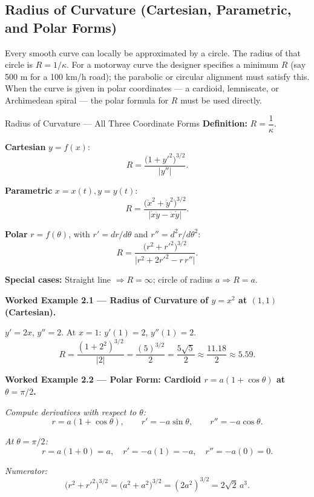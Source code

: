 \documentclass[12pt,a4paper]{article}
\begin{document}
\subsection{Radius of Curvature (Cartesian, Parametric, and Polar Forms)}

Every smooth curve can locally be approximated by a circle. The radius of that circle is $R = 1/\kappa$. For a motorway curve the designer specifies a minimum $R$ (say 500 m for a 100 km/h road); the parabolic or circular alignment must satisfy this. When the curve is given in polar coordinates --- a cardioid, lemniscate, or Archimedean spiral --- the polar formula for $R$ must be used directly.

\begin{infobox}{Radius of Curvature --- All Three Coordinate Forms}
\textbf{Definition:} $R = \dfrac{1}{\kappa}$.

\medskip
\textbf{Cartesian} $y = f(x)$:
\[
  R = \frac{\bigl(1 + y'^{2}\bigr)^{3/2}}{|y''|}.
\]

\textbf{Parametric} $x=x(t), y=y(t)$:
\[
  R = \frac{\bigl(\dot{x}^{2}+\dot{y}^{2}\bigr)^{3/2}}{|\dot{x}\ddot{y} - \ddot{x}\dot{y}|}.
\]

\textbf{Polar} $r = f(\theta)$, with $r' = dr/d\theta$ and $r'' = d^{2}r/d\theta^{2}$:
\[
  R = \frac{\bigl(r^{2}+r'^{2}\bigr)^{3/2}}{\bigl|r^{2}+2r'^{2}-r\,r''\bigr|}.
\]

\textbf{Special cases:} Straight line $\Rightarrow R = \infty$; circle of radius $a \Rightarrow R = a$.
\end{infobox}

\textbf{Worked Example 2.1 --- Radius of Curvature of $y = x^2$ at $(1,1)$ (Cartesian).}

$y' = 2x$, $y'' = 2$. At $x = 1$: $y'(1) = 2$, $y''(1) = 2$.
\[
  R = \frac{(1 + 2^{2})^{3/2}}{|2|} = \frac{(5)^{3/2}}{2} = \frac{5\sqrt{5}}{2} \approx \frac{11.18}{2} \approx 5.59.
\]

\medskip
\textbf{Worked Example 2.2 --- Polar Form: Cardioid $r = a(1+\cos\theta)$ at $\theta = \pi/2$.}

\textit{Compute derivatives with respect to $\theta$:}
\[
  r = a(1+\cos\theta), \qquad r' = -a\sin\theta, \qquad r'' = -a\cos\theta.
\]

\textit{At $\theta = \pi/2$:}
\[
  r = a(1+0) = a,\quad r' = -a(1) = -a,\quad r'' = -a(0) = 0.
\]

\textit{Numerator:}
\[
  \bigl(r^{2}+r'^{2}\bigr)^{3/2} = \bigl(a^{2}+a^{2}\bigr)^{3/2} = (2a^{2})^{3/2} = 2\sqrt{2}\,a^{3}.
\]
\end{document}
